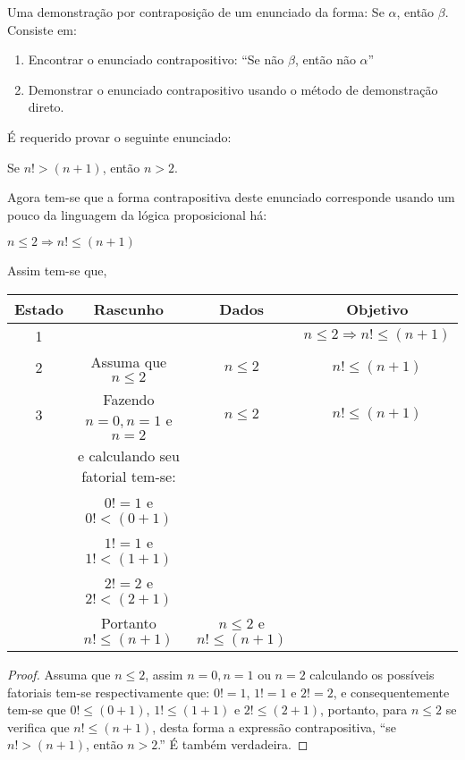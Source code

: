 \begin{method}[Contraposição]\label{metodo:Contraposição}
	Uma demonstração por contraposição de um enunciado da forma: Se $\alpha$, então $\beta$. Consiste em:
	\begin{enumerate}
		\item Encontrar o enunciado contrapositivo: ``Se não $\beta$, então não $\alpha$''
		\item Demonstrar o enunciado contrapositivo usando o método de demonstração direto.
	\end{enumerate}
\end{method}

\begin{exem}\label{exe:DemonstracaoImplicacao3}
	É requerido provar o seguinte enunciado:
	\begin{center}
		Se $n! > (n+1)$, então $n > 2$.
	\end{center}
	Agora tem-se que a forma contrapositiva deste enunciado corresponde  usando um pouco da linguagem da lógica proposicional há:
	\begin{center}
		$n \leq  2 \Rightarrow n! \leq (n+1)$
	\end{center}
	Assim tem-se que,
	\begin{table*}[h]
		\centering
		\begin{tabular}{c|c|c|c}
			\hline
			\rowcolor{cinzaClaro}
			Estado & Rascunho & Dados & Objetivo\\
			\hline
			1 & & & $n \leq  2 \Rightarrow n! \leq (n+1)$\\
			2 & Assuma que  $n \leq 2$ & $n \leq 2$ & $n! \leq (n+1)$\\
			3 & Fazendo $n = 0, n = 1$ e $n=2$  & $n \leq 2$ & $n! \leq (n+1)$\\
			& e calculando seu fatorial tem-se: & & \\
			& $0! = 1$ e $0! < (0+1)$ & & \\
			& $1! = 1$ e $1! < (1+1)$ & & \\  
			& $2! = 2$ e $2! < (2+1)$ & & \\ 
			& Portanto $n! \leq (n+1)$ & $n \leq 2$ e $n! \leq (n+1)$ &\\
			\hline
		\end{tabular}
	\end{table*}

	\begin{proof}
		Assuma que $n \leq 2$, assim $n = 0, n = 1$ ou $n=2$ calculando os possíveis fatoriais tem-se respectivamente que: $0! = 1$, $1! = 1$ e $2! = 2$, e consequentemente tem-se que $0! \leq (0+1)$, $1! \leq (1+1)$ e $2! \leq (2+1)$, portanto, para $n \leq  2$ se verifica que $n! \leq (n+1)$, desta forma a expressão contrapositiva, ``se $n! > (n+1)$, então $n > 2$.'' É também verdadeira.
	\end{proof}
\end{exem}


